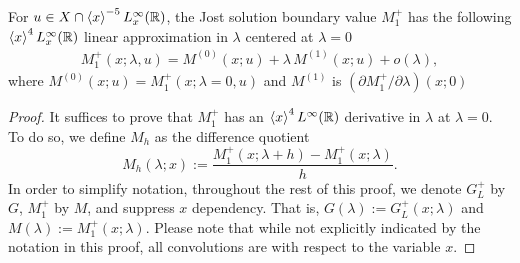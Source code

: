 \documentclass[../dissertation.tex]{subfiles}
\begin{document}
\begin{lma}\label{lma4:Mtexpansion}
	For $u \in X\cap \left\langle x \right\rangle^{-5} L_x^\infty(\mathbb R)$, the Jost solution 
	boundary value
	$M_1^+$ has the following $\left\langle x \right\rangle^4L_x^\infty(\mathbb R)$
	linear approximation in $\lambda$ centered at $\lambda = 0$
	\begin{align}
		M_1^+(x; \lambda, u) 
			= M^{(0)}(x; u) + \lambda \, M^{(1)}(x; u) + o(\lambda),
	\end{align}
	where $M^{(0)}(x; u) = M_1^+(x; \lambda = 0, u)$ and
	$M^{(1)}$ is $(\partial M_1^+ / \partial \lambda)(x; 0)$
\end{lma}
\begin{proof}
	It suf{}fices to prove that $M_1^+$ has an $\left\langle x \right\rangle^4L^\infty(\mathbb R)$ 
	derivative in $\lambda$ at $\lambda = 0$. To do so, we 
	define $M_h$ as the dif{}ference quotient
	\[
		M_h(\lambda; x) :=
			\frac{M_1^+(x; \lambda +h) - M_1^+(x; \lambda)}{h}.
	\]
	In order to simplify notation, throughout the rest of this proof,
	we denote $G_L^+$ by $G$, $M_1^+$ by $M$, and suppress $x$ dependency.
	That is, $G(\lambda):= G_L^+(x; \lambda)$ and $M(\lambda):=M_1^+(x; \lambda)$.
	Please note that while not explicitly indicated by the notation in this
	proof, all convolutions are with respect to the variable $x$.


\end{proof}
\end{document}
